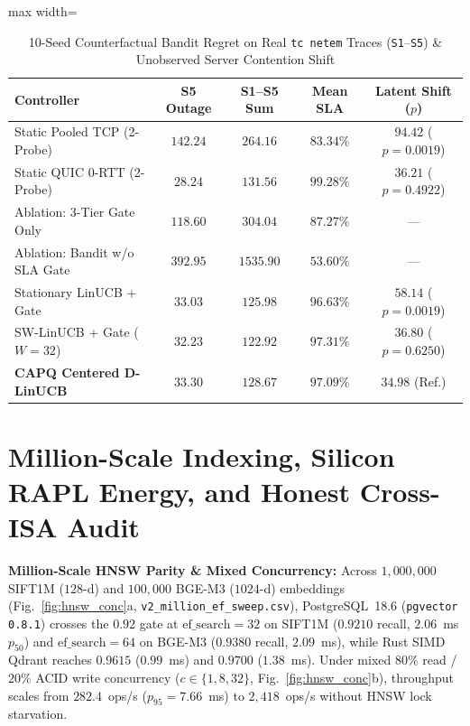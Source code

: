 \documentclass[10pt,journal,compsoc]{IEEEtran}
\begin{document}
\begin{table}[!t]
\centering
\caption{10-Seed Counterfactual Bandit Regret on Real \texttt{tc netem} Traces (\texttt{S1}--\texttt{S5}) \& Unobserved Server Contention Shift}
\label{tab:bandit_main}
\setlength{\tabcolsep}{2.4pt}
\renewcommand{\arraystretch}{1.05}
\begin{adjustbox}{max width=\columnwidth}
\begin{tabular}{@{}lcccc@{}}
\toprule
\textbf{Controller} & \textbf{S5 Outage} & \textbf{S1--S5 Sum} & \textbf{Mean SLA} & \textbf{Latent Shift ($p$)} \\
\midrule
Static Pooled TCP (2-Probe) & $142.24$ & $264.16$ & $83.34\%$ & $94.42$ ($p=0.0019$) \\
Static QUIC 0-RTT (2-Probe) & $28.24$ & $131.56$ & $99.28\%$ & $36.21$ ($p=0.4922$) \\
Ablation: 3-Tier Gate Only & $118.60$ & $304.04$ & $87.27\%$ & --- \\
Ablation: Bandit w/o SLA Gate & $392.95$ & $1535.90$ & $53.60\%$ & --- \\
Stationary LinUCB + Gate & $33.03$ & $125.98$ & $96.63\%$ & $58.14$ ($p=0.0019$) \\
SW-LinUCB + Gate ($W\!=32$) & $32.23$ & $122.92$ & $97.31\%$ & $36.80$ ($p=0.6250$) \\
\textbf{CAPQ Centered D-LinUCB} & $33.30$ & $128.67$ & $97.09\%$ & $\mathbf{34.98}$ (Ref.) \\
\bottomrule
\end{tabular}
\end{adjustbox}
\end{table}


\section{Million-Scale Indexing, Silicon RAPL Energy, and Honest Cross-ISA Audit}\label{sec:arch_eval}
\textbf{Million-Scale HNSW Parity \& Mixed Concurrency:} Across $1{,}000{,}000$ SIFT1M ($128$-d) and $100{,}000$ BGE-M3 ($1024$-d) embeddings (Fig.~\ref{fig:hnsw_conc}a, \texttt{v2\_million\_ef\_sweep.csv}), PostgreSQL~18.6 (\texttt{pgvector 0.8.1}) crosses the $0.92$ gate at $\mathrm{ef\_search}=32$ on SIFT1M ($0.9210$ recall, $2.06$~ms $p_{50}$) and $\mathrm{ef\_search}=64$ on BGE-M3 ($0.9380$ recall, $2.09$~ms), while Rust SIMD Qdrant reaches $0.9615$ ($0.99$~ms) and $0.9700$ ($1.38$~ms). Under mixed $80\%$ read / $20\%$ ACID write concurrency ($c \in \{1,8,32\}$, Fig.~\ref{fig:hnsw_conc}b), throughput scales from $282.4$~ops/s ($p_{95}=7.66$~ms) to $2{,}418$~ops/s without HNSW lock starvation.
\end{document}
